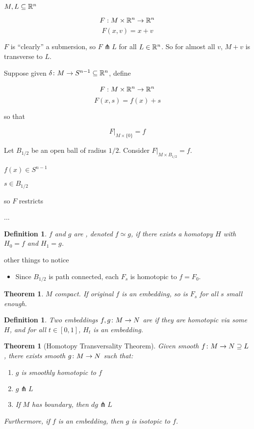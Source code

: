 \documentclass[11pt]{amsbook}
\theoremstyle{mystyle} %
\newtheorem{thrm}[thm]{Theorem}
\newtheorem{defi}[thm]{Definition}
\numberwithin{thm}{section}
\newcommand{\homotopic}{\simeq}
\newcommand{\transverse}{\pitchfork}
\newcommand{\x}{\times}
\begin{document}
\begin{example}
	$M, L \subseteq {\mathbb R}^n$

	$$F: M \x \R^n \to \R^n$$
	$$F(x,v) = x+v$$

	$F$ is ``clearly'' a submersion, so $F \transverse L$ for all $L \in {\mathbb R}^n$.  So for almost all $v$, $M+v$ is transverse to $L$.
\end{example}

\begin{example}
	Suppose given $\delta\colon M \to S^{n-1} \subseteq {\mathbb R}^n$, define

	$$\overset{~}{F}: M \x \R^n \to \R^n$$
	$$\overset{~}{F}(x,s) = f(x) + s$$

	so that

	$$\overset{~}{F}|_{M \x \{0\}} = f$$

	Let $B_{1/2}$ be an open ball of radius $1/2$.
	Consider $\overset{~}{F}|_{M \x B_{1/2}} = f$.

	$f(x) \in S^{n-1}$

	$s \in B_{1/2}$

	so $\overset{~}{F}$ restricts

	...




\begin{defi}
	$f$ and $g$ are , denoted $f \homotopic g$, if there exists a homotopy $H$ with $H_0 = f$ and $H_1 = g$.
\end{defi}
other things to notice
\begin{itemize}
	\item Since $B_{1/2}$ is path connected, each $F_s$ is homotopic to $f = F_0$.
\end{itemize}
\end{example}
\begin{thrm}
	$M$ compact.
	If original $f$ is an embedding, so is $F_s$ for all $s$ small enough.
\end{thrm}
\begin{defi}
	Two embeddings $f,g \colon M \to N$ are  if they are homotopic via some $H$, and for all $t \in [0,1]$, $H_t$ is an embedding.
\end{defi}
\begin{thrm}[Homotopy Transversality Theorem]
	Given smooth $f\colon M \to N \supseteq L$, there exists smooth $g\colon M \to N$ such that:
	\begin{enumerate}
		\item $g$ is smoothly homotopic to $f$
		\item $g \transverse L$
		\item If $M$ has boundary, then $dg \transverse L$
	\end{enumerate}
	Furthermore, if $f$ is an embedding, then $g$ is isotopic to $f$.
\end{thrm}
\end{document}
